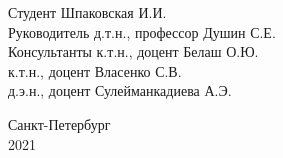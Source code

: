 \begin{center}
\begin{flushleft}
 \hspace{1cm} Студент \hspace{6,3cm} \underline{\hspace{3cm}}  Шпаковская И.И. \\ 
 \vspace{5mm}
 \hspace{1cm} Руководитель \hspace{1cm} д.т.н., профессор \hspace{0,2cm} \underline{\hspace{3cm}}  Душин С.Е.\\ 
 \vspace{5mm}
 \hspace{1cm} Консультанты \hspace{1cm} к.т.н., доцент \hspace{1,0cm} \underline{\hspace{3cm}}  Белаш О.Ю.\\ 
  \vspace{5mm}
 \hspace{5,2cm} к.т.н., доцент \hspace{1cm} \underline{\hspace{3cm}}  Власенко С.В.\\ 
  \vspace{5mm}
 \hspace{5,2cm} д.э.н., доцент \hspace{1cm} \underline{\hspace{3cm}}  Сулейманкадиева А.Э.\\ 
\end{flushleft}

\vspace{1cm}
Санкт-Петербург \\ 2021 
\end{center}
\thispagestyle{empty} %
 


\vspace{0pt plus4fill}%



\restoregeometry
\newpage